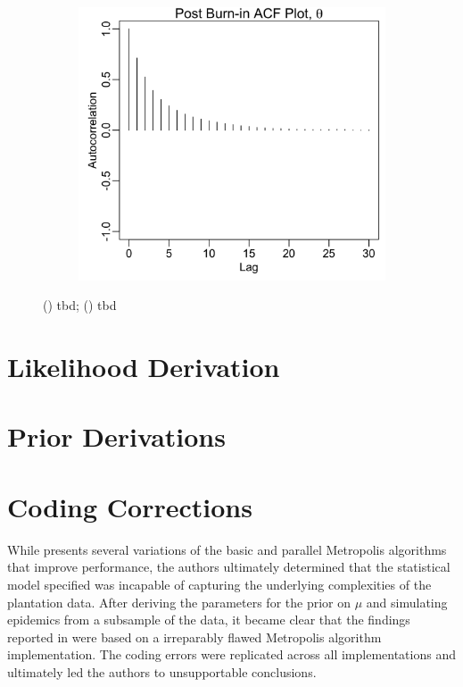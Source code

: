 \documentclass{uwstat572}
\begin{document}
\begin{figure}[H]
\begin{subfigure}[b]{0.49\textwidth}
		\includegraphics[width=\textwidth]{figures/mcmc_acf_plot_theta.png}
		\caption{}
		\label{fig:acf_theta}
	\end{subfigure}
	\caption{() tbd; () tbd }
	\label{fig:data_plot}
\end{figure} 

\newpage
\section{Likelihood Derivation}
\label{likelihood}

\newpage
\section{Prior Derivations}
\label{Priors}

\newpage

\section{Coding Corrections}
\label{coding_corrections}


While \citet{Brown} presents several variations of the basic and parallel Metropolis algorithms that improve performance, the authors ultimately determined that the statistical model specified was incapable of capturing the underlying complexities of the plantation data. 
After deriving the parameters for the prior on $\mu$ and simulating epidemics from a subsample of the data, it became clear that the findings reported in \citet{Brown} were based on a irreparably flawed Metropolis algorithm implementation. 
The coding errors were replicated across all implementations and ultimately led the authors to unsupportable conclusions.
\end{document}

